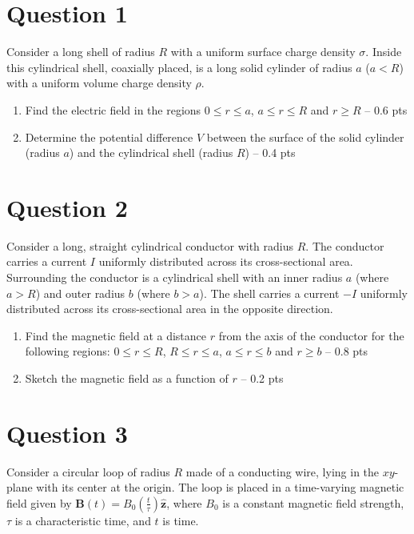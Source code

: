 \documentclass[12pt]{article}
\begin{document}
\section*{Question 1}

Consider a long shell of radius $R$ with a uniform surface charge density $\sigma$. Inside this cylindrical shell, coaxially placed, is a long solid cylinder of radius $a$ ($a<R$) with a uniform volume charge density $\rho$.

\begin{enumerate}
\item[(a)] Find the electric field in the regions $0 \leqslant r \leq a$, $a \leqslant r \leq R$ and $r \geqslant R$ -- 0.6 pts

\item[(b)] Determine the potential difference $V$ between the surface of the solid cylinder (radius $a$) and the cylindrical shell (radius $R$) -- 0.4 pts
\end{enumerate}

\section*{Question 2}

Consider a long, straight cylindrical conductor with radius $R$. The conductor carries a current $I$ uniformly distributed across its cross-sectional area. Surrounding the conductor is a cylindrical shell with an inner radius $a$ (where $a>R$) and outer radius $b$ (where $b>a$). The shell carries a current $-I$ uniformly distributed across its cross-sectional area in the opposite direction.

\begin{enumerate}
\item[(a)] Find the magnetic field at a distance $r$ from the axis of the conductor for the following regions: $0 \leqslant r \leq R$, $R \leqslant r \leq a$, $a \leqslant r \leq b$ and $r \geqslant b$ -- 0.8 pts

\item[(b)] Sketch the magnetic field as a function of $r$ -- 0.2 pts
\end{enumerate}

\section*{Question 3}

Consider a circular loop of radius $R$ made of a conducting wire, lying in the $xy$-plane with its center at the origin. The loop is placed in a time-varying magnetic field given by $\mathbf{B}(t)=B_0\left(\frac{t}{\tau}\right)\hat{\mathbf{z}}$, where $B_0$ is a constant magnetic field strength, $\tau$ is a characteristic time, and $t$ is time.
\end{document}
